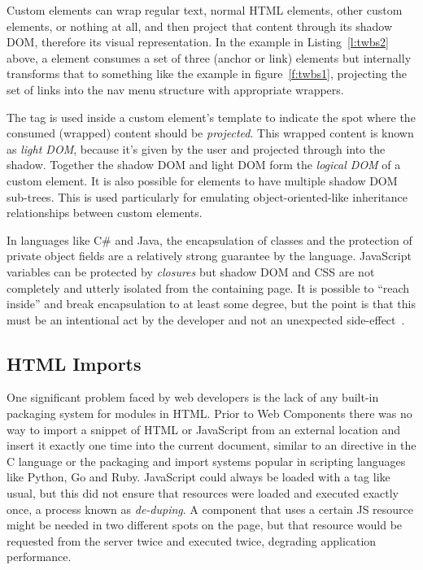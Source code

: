 Custom elements can wrap regular text, normal HTML elements, other custom elements, or nothing at all,
and then project that content through its shadow DOM, 
therefore its visual representation.
In the example in Listing~\ref{l:twbs2} above, 
a \textbf{} element consumes a set of three 
\textbf{} (anchor or link) elements but internally transforms that to something like the example in figure~\ref{f:twbs1}, 
projecting the set of links into the nav menu structure with appropriate wrappers.

The  tag is used inside a custom element's template to indicate the spot where the consumed (wrapped) content should be \textit{projected}. 
This wrapped content is known as 
\textit{light DOM}, 
because it's given by the user and projected through into the shadow.
Together the shadow DOM and light DOM form the \textit{logical DOM} of a custom element.
It is also possible for elements to have multiple shadow DOM sub-trees. 
This is used particularly for emulating object-oriented-like inheritance relationships between custom elements.

In languages like C\# and Java, the encapsulation of classes and the protection of private object fields are a relatively strong guarantee by the language.
JavaScript variables can be protected by \textit{closures}
but shadow DOM and CSS are not completely and utterly isolated from the containing page.
It is possible to ``reach inside'' and break encapsulation to at least some degree, 
but the point is that this must be an intentional act by the developer and not an unexpected side-effect~\cite{bidelman2014}.

\subsection{HTML Imports}
One significant problem faced by web developers is the lack of any built-in packaging system for modules in HTML.
Prior to Web Components there was no way to import a snippet of HTML or JavaScript from an external location and insert it exactly one time into the current document, 
similar to an  directive in the C language or the packaging and import systems popular in scripting languages
like Python, Go and Ruby. 
JavaScript could always be loaded with a  tag like usual, but this did not ensure that resources were loaded and executed exactly once, a process known as \textit{de-duping}.
A component that uses a certain JS resource might be needed in two different spots on the page, 
but that resource would be requested from the server twice and executed twice, degrading application performance.

